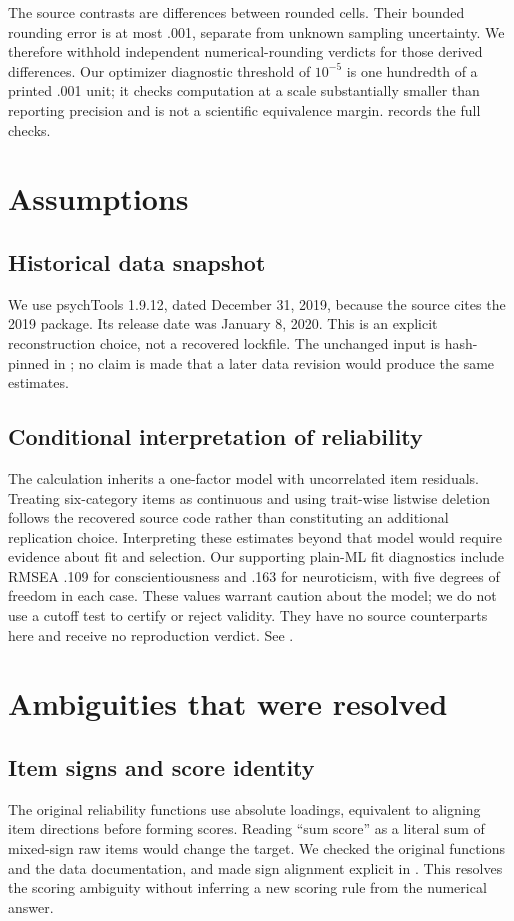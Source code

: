 The source contrasts are differences between rounded cells. Their bounded rounding error is at most .001, separate from unknown sampling uncertainty. We therefore withhold independent numerical-rounding verdicts for those derived differences. Our optimizer diagnostic threshold of $10^{-5}$ is one hundredth of a printed .001 unit; it checks computation at a scale substantially smaller than reporting precision and is not a scientific equivalence margin.  records the full checks.

\section{Assumptions}
\subsection{Historical data snapshot}
We use psychTools 1.9.12, dated December 31, 2019, because the source cites the 2019 package. Its release date was January 8, 2020. This is an explicit reconstruction choice, not a recovered lockfile. The unchanged input is hash-pinned in ; no claim is made that a later data revision would produce the same estimates.
\subsection{Conditional interpretation of reliability}
The calculation inherits a one-factor model with uncorrelated item residuals. Treating six-category items as continuous and using trait-wise listwise deletion follows the recovered source code rather than constituting an additional replication choice. Interpreting these estimates beyond that model would require evidence about fit and selection. Our supporting plain-ML fit diagnostics include RMSEA .109 for conscientiousness and .163 for neuroticism, with five degrees of freedom in each case. These values warrant caution about the model; we do not use a cutoff test to certify or reject validity. They have no source counterparts here and receive no reproduction verdict. See .

\section{Ambiguities that were resolved}
\subsection{Item signs and score identity}
The original reliability functions use absolute loadings, equivalent to aligning item directions before forming scores. Reading ``sum score'' as a literal sum of mixed-sign raw items would change the target. We checked the original functions and the data documentation, and made sign alignment explicit in . This resolves the scoring ambiguity without inferring a new scoring rule from the numerical answer.
